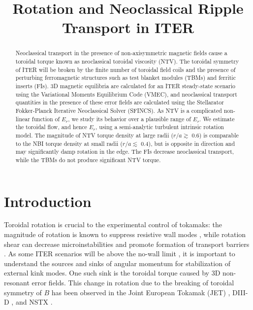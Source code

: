 \documentclass{article}
\title{Rotation and Neoclassical Ripple Transport in ITER}
\numberwithin{figure}{section}
\numberwithin{equation}{section}
\begin{document}
\maketitle

\begin{abstract}

Neoclassical transport in the presence of non-axisymmetric magnetic fields cause a toroidal torque known as neoclassical toroidal viscosity (NTV). The toroidal symmetry of ITER will be broken by the finite number of toroidal field coils and the presence of perturbing ferromagnetic structures such as test blanket modules (TBMs) and ferritic inserts (FIs). 3D magnetic equilibria are calculated for an ITER steady-state scenario using the Variational Moments Equilibrium Code (VMEC), and neoclassical transport quantities in the presence of these error fields are calculated using the Stellarator Fokker-Planck Iterative Neoclassical Solver (SFINCS). As NTV is a complicated non-linear function of $E_r$, we study its behavior over a plausible range of $E_r$. We estimate the toroidal flow, and hence $E_r$, using a semi-analytic turbulent intrinsic rotation model. The magnitude of NTV torque density at large radii ($r/a \gtrsim$ 0.6) is comparable to the NBI torque density at small radii ($r/a \lesssim$ 0.4), but is opposite in direction and may significantly damp rotation in the edge. The FIs decrease neoclassical transport, while the TBMs do not produce significant NTV torque. 
\end{abstract}

\section{Introduction}

Toroidal rotation is crucial to the experimental control of tokamaks: the magnitude of rotation is known to suppress resistive wall modes \cite{Bondeson1994, Garofalo2002}, while rotation shear can decrease microinstabilities and promote formation of transport barriers \cite{Burrell1997, Terry2000}. As some ITER scenarios will be above the no-wall limit \cite{Liu2004}, it is important to understand the sources and sinks of angular momentum for stabilization of external kink modes. One such sink is the toroidal torque caused by 3D non-resonant error fields. This change in rotation due to the breaking of toroidal symmetry of $B$ has been observed in the Joint European Tokamak (JET) \cite{Lazzaro2002, DeVries2008}, DIII-D \cite{Garofalo2008}, and NSTX \cite{Zhu2006}. 
\end{document}
